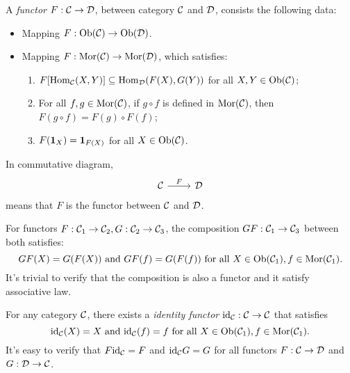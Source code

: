 \documentclass{article}
\begin{document}
\begin{defi}\label{functor}
	A \emph{functor} $F:\mathcal{C}\to\mathcal{D}$, between category $\mathcal{C}$ and $\mathcal{D}$, consists the following data:
	\begin{itemize}
		\item Mapping $F:\mathrm{Ob}(\mathcal{C})\to\mathrm{Ob}(\mathcal{D})$.
		\item Mapping $F:\mathrm{Mor}(\mathcal{C})\to\mathrm{Mor}(\mathcal{D})$, which satisfies:
		\begin{enumerate}
			\item $F[\mathrm{Hom}_{\mathcal{C}}(X,Y)]\subseteq\mathrm{Hom}_{\mathcal{D}}(F(X),G(Y))$ for all $X,Y\in\mathrm{Ob}(\mathcal{C})$;
			\item For all $f,g\in\mathrm{Mor}(\mathcal{C})$, if $g\circ f$ is defined in $\mathrm{Mor}(\mathcal{C})$, then $F(g\circ f)=F(g)\circ F(f)$;
			\item $F(\mathbf{1}_X)=\mathbf{1}_{F(X)}$ for all $X\in\mathrm{Ob}(\mathcal{C})$.
		\end{enumerate}
	\end{itemize}
	In commutative diagram,
	\[\begin{tikzcd}
			\C\arrow[r,"F"] & \D
	\end{tikzcd}\]
	means that $F$ is the functor between $\mathcal{C}$ and $\mathcal{D}$.
	
	For functors $F:\mathcal{C}_1\to\mathcal{C}_2,G:\mathcal{C}_2\to\mathcal{C}_3$, the composition $GF:\mathcal{C}_1\to\mathcal{C}_3$ between both satisfies:
		\[GF(X)=G(F(X))\ \text{and}\ GF(f)=G(F(f))\ \text{for all}\ X\in\Ob(\C_1),f\in\Mor(\C_1).\]
	It's trivial to verify that the composition is also a functor and it satisfy associative law.
		
	For any category $\mathcal{C}$, there exists a \emph{identity functor} $\mathrm{id}_{\mathcal{C}}:\mathcal{C}\to\mathcal{C}$ that satisfies
		\[\mathrm{id}_{\mathcal{C}}(X)=X\ \text{and}\ \mathrm{id}_{\mathcal{C}}(f)=f\ \text{for all}\ X\in\mathrm{Ob}(\mathcal{C}_1),f\in\mathrm{Mor}(\mathcal{C}_1).\]
	It's easy to verify that $F\mathrm{id}_{\mathcal{C}}=F$ and $\mathrm{id}_{\mathcal{C}} G=G$ for all functors $F:\mathcal{C}\to\mathcal{D}$ and $G:\mathcal{D}\to\mathcal{C}$.
\end{defi}
\end{document}
